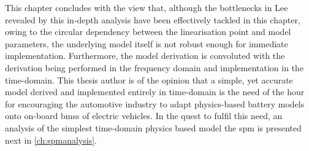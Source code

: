

This  chapter  concludes  with  the  view  that,  although  the  bottlenecks  in
Lee~\etal~\cite{Lee2012a}  revealed   by  this   in-depth  analysis   have  been
effectively tackled  in this chapter,  owing to the circular  dependency between
the linearisation point and model parameters, the underlying model itself is not
robust enough for immediate implementation. Furthermore, the model derivation is
convoluted  with the  derivation being  performed  in the  frequency domain  and
implementation in the  time-domain. This thesis author is of  the opinion that a
simple, yet  accurate model derived  and implemented entirely in  time-domain is
the  need  of  the  hour  for  encouraging  the  automotive  industry  to  adapt
physics-based battery models onto on-board  \glspl{bms} of electric vehicles. In
the quest to  fulfil this need, an analysis of  the simplest time-domain physics
based model \viz{} the \gls{spm} is presented next in \cref{ch:spmanalysis}.
